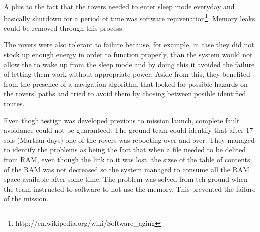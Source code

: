 A plus to the fact that the rovers needed to enter sleep mode everyday and
basically shutdown for a period of time was software
rejuvenation\footnote{http://en.wikipedia.org/wiki/Software\_aging}. Memory
leaks could be removed through this process.

The rovers were also tolerant to failure because, for example, in case they did
not stock up enough energy in order to function properly, than the system would
not allow the to wake up from the sleep mode and by doing this it avoided the
failure of letting them work without appropriate power. Aside from this, they
benefited from the presence of a navigation algorithm that looked for possible
hazards on the rovers' paths and tried to avoid them by chosing between posible
identified routes.

Even thogh testign was developed previous to mission launch, complete fault
avoidance could not be guaranteed. The ground team could identify that after 17
sols (Martian days) one of the rovers was rebooting over and over. They managed
to identify the problems as being the fact that when a file needed to be delited
from RAM, even though the link to it was lost, the sizse of the table of
contents of the RAM was not decreased so the system managed to consume all the
RAM space available after some time. The problem was solved from teh ground when
the team instructed to software to not use the memory. This prevented the
failure of the mission.
